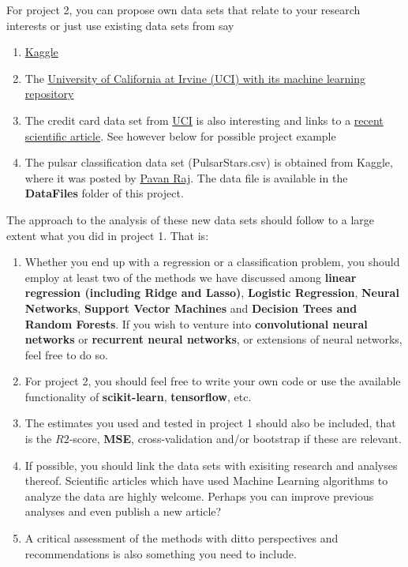 \documentclass[%
oneside,                 %
final,                   %
10pt]{article}
\begin{document}
For project 2, you can propose own data sets that relate to your research interests or just use existing data sets from say
\begin{enumerate}
\item \href{{https://www.kaggle.com/datasets}}{Kaggle} 

\item The \href{{http://archive.ics.uci.edu/ml/datasets.html}}{University of California at Irvine (UCI) with its  machine learning repository}

\item The credit card data set from \href{{https://archive.ics.uci.edu/ml/datasets/default+of+credit+card+clients}}{UCI} is also interesting and links to a \href{{https://bradzzz.gitbooks.io/ga-seattle-dsi/content/dsi/dsi_05_classification_databases/2.1-lesson/assets/datasets/DefaultCreditCardClients_yeh_2009.pdf}}{recent scientific article}.  See however below for possible project example

\item The pulsar classification data set (PulsarStars.csv) is obtained from Kaggle, where it was posted by \href{{https://www.kaggle.com/pavanraj159/predicting-pulsar-star-in-the-universe/notebook?scriptVersionId=4487650}}{Pavan Raj}. The data file is available in the \textbf{DataFiles} folder of this project. 
\end{enumerate}

\noindent
The approach to the analysis of these new data sets should follow to a large extent what you did in project 1. That is:
\begin{enumerate}
\item Whether you end up with a regression or a classification problem, you should employ at least two of the methods we have discussed among \textbf{linear regression (including Ridge and Lasso)}, \textbf{Logistic Regression}, \textbf{Neural Networks}, \textbf{Support Vector Machines} and \textbf{Decision Trees and Random Forests}.  If you wish to venture into \textbf{convolutional neural networks} or \textbf{recurrent neural networks}, or extensions of neural networks, feel free to do so. 

\item For project 2, you should feel free to write your own code or use the available functionality of \textbf{scikit-learn}, \textbf{tensorflow}, etc. 

\item The estimates you used and tested in project 1 should also be included, that is the $R2$-score, \textbf{MSE}, cross-validation and/or bootstrap if these are relevant. 

\item If possible, you should link the data sets with exisiting research and analyses thereof. Scientific articles which have used Machine Learning algorithms to analyze the data are highly welcome. Perhaps you can improve previous analyses and even publish a new article? 

\item A critical assessment of the methods with ditto perspectives and recommendations is also something you need to include.
\end{enumerate}
\end{document}
